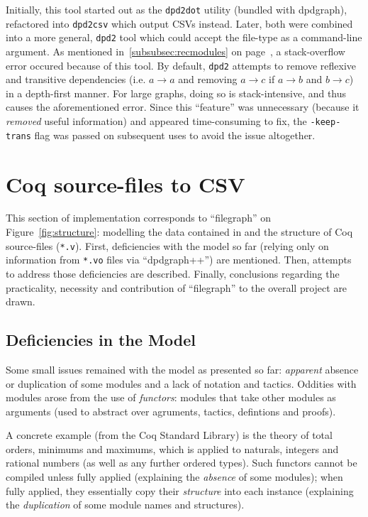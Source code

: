 Initially, this tool started out as the \texttt{dpd2dot} utility (bundled with
dpdgraph), refactored into \texttt{dpd2csv} which output CSVs instead. Later,
both were combined into a more general, \texttt{dpd2} tool which could accept
the file-type as a command-line argument. As mentioned
in~\ref{subsubsec:recmodules} on page~\pageref{subsubsec:recmodules}, a
stack-overflow error occured because of this tool. By default, \texttt{dpd2}
attempts to remove reflexive and transitive dependencies (i.e. $a \rightarrow a$
and removing $a \rightarrow c$ if $a \rightarrow b$ and $b \rightarrow c$) in a
depth-first manner.  For large graphs, doing so is stack-intensive, and thus
causes the aforementioned error. Since this ``feature'' was unnecessary (because
it \emph{removed} useful information) and appeared time-consuming to fix, the
\texttt{-keep-trans} flag was passed on subsequent uses to avoid the issue
altogether.

\section{Coq source-files to CSV}

This section of implementation corresponds to ``filegraph'' on
Figure~\ref{fig:structure}: modelling the data contained in and the structure of
Coq source-files (\texttt{*.v}). First, deficiencies with the model so far
(relying only on information from \texttt{*.vo} files via ``dpdgraph++'') are
mentioned. Then, attempts to address those deficiencies are described. Finally,
conclusions regarding the practicality, necessity and contribution of
``filegraph'' to the overall project are drawn.

\subsection{Deficiencies in the Model}

Some small issues remained with the model as presented so far: \emph{apparent}
absence or duplication of some modules and a lack of notation and tactics.
Oddities with modules arose from the use of \emph{functors}: modules that take
other modules as arguments (used to abstract over agruments, tactics,
defintions and proofs).

A concrete example (from the Coq Standard Library) is the theory of total
orders, minimums and maximums, which is applied to naturals, integers and
rational numbers (as well as any further ordered types). Such functors cannot be
compiled unless fully applied (explaining the \emph{absence} of some modules);
when fully applied, they essentially copy their \emph{structure} into each
instance (explaining the \emph{duplication} of some module names and
structures).

